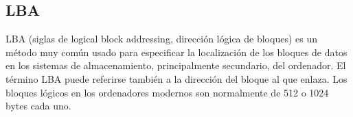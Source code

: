 	\subsection{LBA}\label{sec:lba}

		LBA (siglas de logical block addressing, dirección lógica de bloques)
		es un método muy común usado para especificar la localización de los
		bloques de datos en los sistemas de almacenamiento, principalmente
		secundario, del ordenador. El término LBA puede referirse también a la
		dirección del bloque al que enlaza.  Los bloques lógicos en los
		ordenadores modernos son normalmente de 512 o 1024 bytes cada uno.

	\newpage
